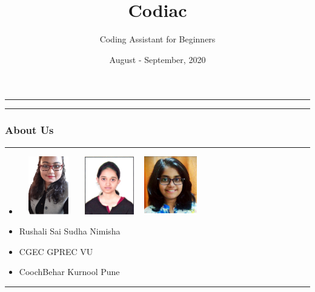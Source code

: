 \documentclass[14pt]{beamer}
\title[Codiac]{Codiac}
\author[]{Coding Assistant for Beginners}
\date []{August - September, 2020}
\begin{document}
\begin{frame}
    \noindent
    {\color{pink} \rule{\linewidth}{0.7mm} }
    \titlepage
    \noindent
    {\color{pink} \rule{\linewidth}{0.7mm} }
\end{frame}

\begin{frame}
    \frametitle{About Us}
    \noindent
    {\color{pink} \rule {\linewidth}{0.7mm}}
    \begin{itemize}
      \item [] \includegraphics[width=1in, height=1in]{./Codiac/logos/rushali.jpeg}\hspace{1cm} \includegraphics[width=1in, height=1in]{./Codiac/logos/sudha.jpeg}\hspace{1cm} \includegraphics[width=1in, height=1in]{./Codiac/logos/nimisha.jpg}\hspace{1cm} \\
      \item [] Rushali\hspace{2cm} Sai Sudha\hspace{1.8cm} Nimisha\\
      \item [] \small CGEC\hspace{2.5cm} \small GPREC \hspace{2.4cm} \small VU\\
      \item [] \small CoochBehar\hspace{1.5cm} \small Kurnool \hspace{2.2cm} \small Pune\\
    \end{itemize}
    \noindent
    {\color{pink} \rule{\linewidth}{0.7mm}}
\end{frame}
\end{document}
